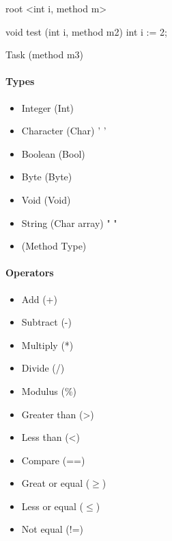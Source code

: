 \documentclass[paper=a4, fontsize=11pt]{article}
\numberwithin{equation}{section}	%
\numberwithin{figure}{section}		%
\numberwithin{table}{section}		%
\begin{document}
            root <int i, method m>{
            	void test (int i, method m2){
            		int i := 2;
            	}
            
            	Task (method m3) {
            	
            	}
            }


            \paragraph*{Types}
            \begin{itemize}
            	\item Integer (Int)
            	\item Character (Char) ' '
            	\item Boolean (Bool) 
            	\item Byte (Byte)
            	\item Void (Void)
            	\item String (Char array) " "
            	\item (Method Type)
            \end{itemize}

            \paragraph*{Operators}
            \begin{itemize}
            	\item Add (+)
            	\item Subtract (-)
            	\item Multiply (*)
            	\item Divide (/)
            	\item Modulus ($\%$)
            	\item Greater than (>)
            	\item Less than (<)
            	\item Compare (==)
            	\item Great or equal ($\geq$)
            	\item Less or equal ($\leq$)
            	\item Not equal (!=)
            \end{itemize}
\end{document}

